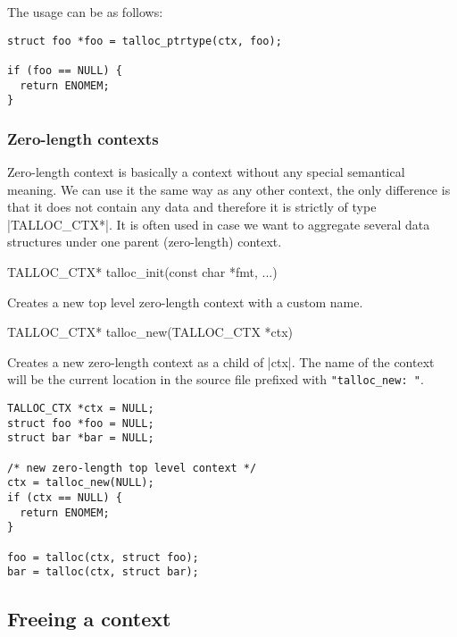 The usage can be as follows:

\begin{lstlisting}[caption={talloc_ptrtype(ctx, ptr)},label=lst:talloc_ptrtype]
struct foo *foo = talloc_ptrtype(ctx, foo);

if (foo == NULL) {
  return ENOMEM;
}

\end{lstlisting}

\subsubsection{Zero-length contexts}

Zero-length context is basically a context without any special semantical
meaning. We can use it the same way as any other context, the only difference is
that it does not contain any data and therefore it is strictly of type
|TALLOC_CTX*|. It is often used in case we want to aggregate several data
structures under one parent (zero-length) context.

\begin{funcproto}
TALLOC_CTX* talloc_init(const char *fmt, ...)
\end{funcproto}
\begin{funcdesc}
Creates a new top level zero-length context with a custom name.
\end{funcdesc}
\begin{funcproto}
TALLOC_CTX* talloc_new(TALLOC_CTX *ctx)
\end{funcproto}
\begin{funcdesc}
Creates a new zero-length context as a child of |ctx|. The name of the context
will be the current location in the source file prefixed with
\lstinline[showspaces=true]{"talloc_new: "}.
\end{funcdesc}

\begin{lstlisting}[caption={talloc_new()},label=lst:talloc_new]
TALLOC_CTX *ctx = NULL;
struct foo *foo = NULL;
struct bar *bar = NULL;

/* new zero-length top level context */
ctx = talloc_new(NULL);
if (ctx == NULL) {
  return ENOMEM;
}

foo = talloc(ctx, struct foo);
bar = talloc(ctx, struct bar);
\end{lstlisting}

\subsection{Freeing a context}
\label{talloc:subsec:free-context}

